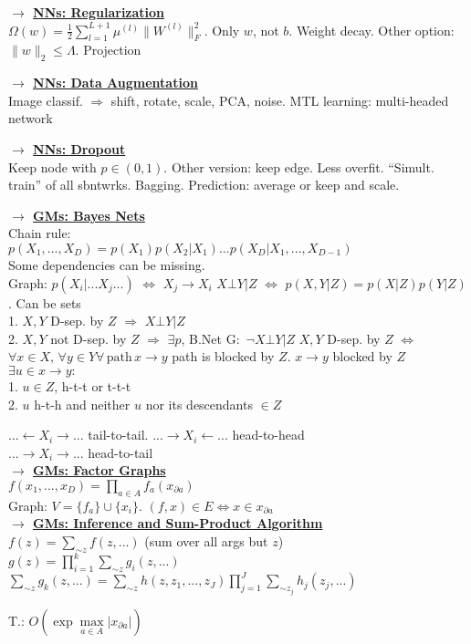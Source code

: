 \documentclass[11pt]{article}
\newcommand{\mytitle}[1]{ {\bf $\rightarrow$ \underline{#1}}\\}
\begin{document}
\begin{multicols*}{2}
\mytitle{NNs: Regularization}
$\Omega(w)=\frac{1}{2}\sum\limits_{l=1}^{L+1}\mu^{(l)}\|W^{(l)}\|_F^2$.
Only $w$, not $b$. Weight decay.
Other option: $\|w\|_2\leqslant \Lambda$. Projection

\mytitle{NNs: Data Augmentation}
Image classif. $\Rightarrow$ shift, rotate, scale, PCA, noise.
MTL learning: multi-headed network

\mytitle{NNs: Dropout}
Keep node with $p\in(0,1)$. Other version: keep edge.
Less overfit. ``Simult. train'' of all sbntwrks. Bagging.
Prediction: average or keep and scale.

\mytitle{GMs: Bayes Nets}
Chain rule:\\
$p(X_1,...,X_D)=p(X_1)p(X_2|X_1)...p(X_D|X_1,...,X_{D-1})$\\
Some dependencies can be missing.\\
Graph: $p(X_i|...X_j...)$ $\Leftrightarrow$ $X_j\to X_i$
$X\bot Y|Z$ $\Leftrightarrow$ $p(X, Y|Z)=p(X|Z)p(Y|Z)$. Can be sets\\
1. $X, Y$ D-sep. by $Z$ $\Rightarrow$ $X\bot Y|Z$\\
2. $X, Y$ not D-sep. by $Z$ $\Rightarrow$ $\exists p$, B.Net G$\colon$ $\neg X\bot Y|Z$
$X,Y$ D-sep. by $Z$ $\Leftrightarrow$ $\forall x\in X,\,\forall y\in Y \forall\, \mbox{path}\, x\to y$ path is blocked by $Z$. $x\to y$ blocked by $Z$ $\exists u\in x\to y\colon$\\
1. $u\in Z$, h-t-t or t-t-t\\
2. $u$ h-t-h and neither $u$ nor its descendants $\in Z$

$...\leftarrow X_i\rightarrow...$ tail-to-tail.
$...\rightarrow X_i\leftarrow...$ head-to-head\\
$...\rightarrow X_i\rightarrow...$ head-to-tail\\
\mytitle{GMs: Factor Graphs}
$f(x_1,...,x_D)=\prod\limits_{a\in A}f_a(x_{\partial a})$\\
Graph: $V=\{f_a\}\cup\{x_i\}$. $(f,x)\in E\Leftrightarrow x\in x_{\partial a}$\\

\mytitle{GMs: Inference and Sum-Product Algorithm}
$f(z)=\sum\limits_{\sim z}f(z,...)$ (sum over all args but $z$)\\
$g(z)=\prod\limits_{i=1}^k\sum\limits_{\sim z}g_i(z,...)$\\
$\sum\limits_{\sim z}g_k(z,...)=\sum\limits_{\sim z}h(z,z_1,...,z_J)\prod\limits_{j=1}^J\sum\limits_{\sim z_j}h_j(z_j,...)$

T.: $O\left(\exp \max\limits_{a\in A}|x_{\partial a}|\right)$
\end{multicols*}
\end{document}
